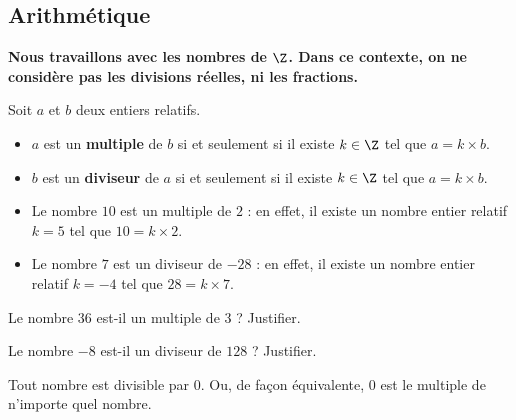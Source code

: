 \documentclass{article}
\begin{document}
\subsection{Arithmétique}
\textbf{Nous travaillons avec les nombres de $\Z$. Dans ce contexte, on ne considère pas les divisions réelles, ni les fractions.}
\begin{tcolorbox}
\begin{definition}
Soit $a$ et $b$ deux entiers relatifs.
\begin{itemize}
\item $a$ est un \textbf{multiple} de $b$ si et seulement si il existe $k \in \Z$ tel que $a = k \times b$.
\item $b$ est un \textbf{diviseur} de $a$ si et seulement si il existe $k \in \Z$ tel que $a = k \times b$.
\end{itemize}
\end{definition}
\end{tcolorbox}
\begin{example}
\hfill
\begin{itemize}
\item Le nombre $10$ est un multiple de $2$ : en effet, il existe un nombre entier relatif $k = 5$ tel que $10 = k \times 2$.
\item Le nombre $7$ est un diviseur de $-28$ : en effet, il existe un nombre entier relatif $k = -4$ tel que $28 = k \times 7$.
\end{itemize}
\end{example}
\begin{example}
\hfill

Le nombre $36$ est-il un multiple de $3$ ? Justifier. \answersline

Le nombre $-8$ est-il un diviseur de $128$ ? Justifier. \answersline
\end{example}

\begin{remark}
Tout nombre est divisible par $0$. Ou, de façon équivalente, $0$ est le multiple de n'importe quel nombre. 
\end{remark}
\end{document}
